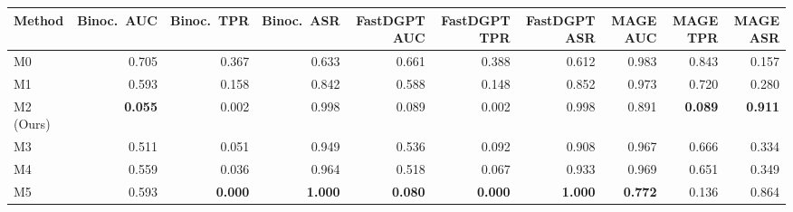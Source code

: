 \begin{tabular}{lrrrrrrrrr}
\toprule
Method & Binoc.\ AUC & Binoc.\ TPR & Binoc.\ ASR & FastDGPT AUC & FastDGPT TPR & FastDGPT ASR & MAGE AUC & MAGE TPR & MAGE ASR \\
\midrule
M0 & 0.705 & 0.367 & 0.633 & 0.661 & 0.388 & 0.612 & 0.983 & 0.843 & 0.157 \\
M1 & 0.593 & 0.158 & 0.842 & 0.588 & 0.148 & 0.852 & 0.973 & 0.720 & 0.280 \\
M2 (Ours) & \textbf{0.055} & 0.002 & 0.998 & 0.089 & 0.002 & 0.998 & 0.891 & \textbf{0.089} & \textbf{0.911} \\
M3 & 0.511 & 0.051 & 0.949 & 0.536 & 0.092 & 0.908 & 0.967 & 0.666 & 0.334 \\
M4 & 0.559 & 0.036 & 0.964 & 0.518 & 0.067 & 0.933 & 0.969 & 0.651 & 0.349 \\
M5 & 0.593 & \textbf{0.000} & \textbf{1.000} & \textbf{0.080} & \textbf{0.000} & \textbf{1.000} & \textbf{0.772} & 0.136 & 0.864 \\
\bottomrule
\end{tabular}
